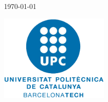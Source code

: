 \begin{titlepage}
	
	\vfill\vfill\vfill\vfill\vfill\vfill %

        {\large\today}
	
	\vfill
        \includegraphics[width=0.4\textwidth]{figures/UPC.png}
	 
	\vfill %
\end{titlepage}